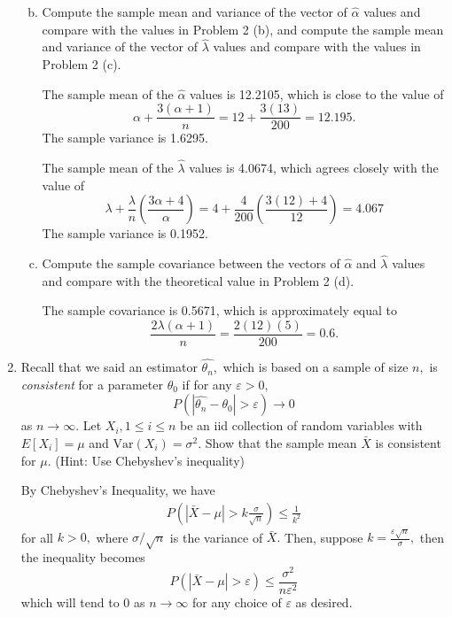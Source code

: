 \documentclass{article}
\newcommand{\var}{\mathrm{Var}}
\begin{document}
\begin{enumerate}
\begin{enumerate}[a)]
\begin{soln}
				\end{soln}

			\item Compute the sample mean and variance of the vector of $\hat{\alpha}$ values and compare with the values in Problem 2 (b), and compute the sample mean and variance of the vector of $\hat{\lambda}$ values and compare with the values in Problem 2 (c).
				\begin{soln}
					The sample mean of the $\hat{\alpha}$ values is 12.2105, which is close to the value of \[\alpha+\frac{3(\alpha+1)}{n}=12+\frac{3(13)}{200}=12.195.\] The sample variance is 1.6295.

					The sample mean of the $\hat{\lambda}$ values is 4.0674, which agrees closely with the value of \[\lambda+\frac{\lambda}{n}\left( \frac{3\alpha+4}{\alpha}\right) = 4+\frac{4}{200}\left( \frac{3(12)+4}{12} \right)=4.067\]The sample variance is 0.1952.

				\end{soln}

			\item Compute the sample covariance between the vectors of $\hat{\alpha}$ and $\hat{\lambda}$ values and compare with the theoretical value in Problem 2 (d).
				\begin{soln}
					The sample covariance is 0.5671, which is approximately equal to \[\frac{2\lambda(\alpha+1)}{n}=\frac{2(12)(5)}{200}=0.6.\] 
				\end{soln}
				
		\end{enumerate}

	\item Recall that we said an estimator $\hat{\theta_n},$ which is based on a sample of size $n,$ is \textit{consistent} for a parameter $\theta_0$ if for any $\varepsilon>0,$ \[P\left( |\hat{\theta_n}-\theta_0| > \varepsilon \right)\to 0\] as $n\to\infty.$ Let $X_i, 1\le i\le n$ be an iid collection of random variables with $E[X_i]=\mu$ and $\var(X_i)=\sigma^2.$ Show that the sample mean $\bar{X}$ is consistent for $\mu$. (Hint: Use Chebyshev's inequality)
		\begin{soln}
			By Chebyshev's Inequality, we have 
			\begin{align*}
				P\left( |\bar{X}-\mu| > k\frac{\sigma}{\sqrt{n}} \right) \le \frac{1}{k^2}
			\end{align*} for all $k>0,$ where $\sigma/\sqrt{n}$ is the variance of $\bar{X}.$ Then, suppose $k=\frac{\varepsilon\sqrt{n}}{\sigma},$ then the inequality becomes
			\[ P\left( |\bar{X}-\mu| > \varepsilon \right) \le \frac{\sigma^2}{n\varepsilon^2}\] which will tend to 0 as $n\to\infty$ for any choice of $\varepsilon$ as desired.
		\end{soln}

\end{enumerate}
\end{document}
